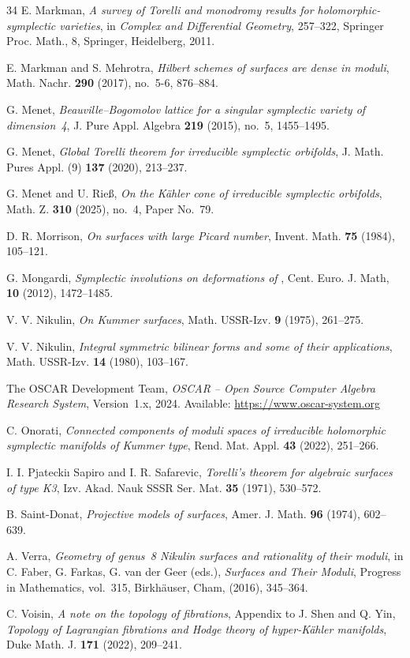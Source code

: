\documentclass{amsart}
\makeatletter
\theoremstyle{definition}
\numberwithin{equation}{section}
\numberwithin{equation}{section} \theoremstyle{definition}
\newcounter{mathrecordid}
\newcommand{\mathboxbegin}[1]{%
  \stepcounter{mathrecordid}%
  \immediate\write\mathrecords{\themathrecordid,#1}%
  \special{pdf:bann << /Type /Annot /Subtype /Link /Border [0 0 0]
    /MathBoxID \themathrecordid /F 2
    /A << /S /URI /URI (urn:mathbox:\themathrecordid) >> >>}}
\newcommand{\mathboxinlineplain}[1]{$#1$}
\newcommand{\mathboxinline}[1]{%
  $\mathboxbegin{inline}%
  \special{pdf:literal direct /MathBoxBegin\themathrecordid\space MP}%
  #1\special{pdf:literal direct /MathBoxEnd\themathrecordid\space MP}%
  \special{pdf:eann}$}
\newcommand{\recordmath}{%
  \ifmeasuring@\expandafter\mathboxinlineplain
  \else\expandafter\mathboxinline\fi}
\makeatother
\begin{document}
\begin{thebibliography}{34}
 E. Markman,
  \emph{A survey of Torelli and monodromy results for holomorphic-symplectic
  varieties}, in {\it Complex and Differential Geometry}, 257--322, Springer
  Proc. Math., 8, Springer, Heidelberg, 2011.

 E. Markman and S. Mehrotra,
  \emph{Hilbert schemes of \recordmath{K3} surfaces are dense in moduli},
  Math. Nachr. {\bf 290} (2017), no.~5-6, 876--884.

 G. Menet,
  \emph{Beauville--Bogomolov lattice for a singular symplectic variety of
  dimension~4}, J. Pure Appl. Algebra {\bf 219} (2015), no.~5, 1455--1495.

 G. Menet,
  \emph{Global Torelli theorem for irreducible symplectic orbifolds},
  J. Math. Pures Appl. (9) {\bf 137} (2020), 213--237.

 G. Menet and U. Rie\ss,
  \emph{On the K\"ahler cone of irreducible symplectic orbifolds},
  Math. Z. {\bf 310} (2025), no.~4, Paper No.~79.

 D. R. Morrison,
  \emph{On \recordmath{K3} surfaces with large Picard number},
  Invent. Math. {\bf 75} (1984), 105--121.

 G. Mongardi,
  \emph{Symplectic involutions on deformations of \recordmath{K3^{[2]}}}, Cent. Euro. J. Math,
 {\bf 10} (2012), 1472--1485.
 
  V. V. Nikulin,
  \emph{On Kummer surfaces}, Math. USSR-Izv. {\bf 9} (1975), 261--275.


 V. V. Nikulin,
  \emph{Integral symmetric bilinear forms and some of their applications},
  Math. USSR-Izv. {\bf 14} (1980), 103--167.


  The OSCAR Development Team,
  \textit{OSCAR -- Open Source Computer Algebra Research System},
  Version~1.x,
  2024.
  Available: \url{https://www.oscar-system.org}


 C. Onorati,
  \emph{Connected components of moduli spaces of irreducible holomorphic
  symplectic manifolds of Kummer type},
  Rend. Mat. Appl. {\bf 43} (2022), 251--266.
 
   I. I. Pjateckiı Sapiro and I. R.
Safarevic, \emph{Torelli’s theorem for algebraic surfaces of
type K3}, Izv. Akad. Nauk SSSR Ser. Mat. {\bf 35} (1971), 530–572.

 B. Saint-Donat,
  \emph{Projective models of \recordmath{K3} surfaces},
  Amer. J. Math. {\bf 96} (1974), 602--639.

 A. Verra,
  \emph{Geometry of genus~8 Nikulin surfaces and rationality of their moduli},
  in C. Faber, G. Farkas, G. van der Geer (eds.), {\it \recordmath{K3} Surfaces and Their
  Moduli}, Progress in Mathematics, vol.~315, Birkh\"auser, Cham, (2016),
   345--364.

 C. Voisin, \emph{A note on the topology of fibrations}, Appendix to J. Shen and Q. Yin, \emph{Topology of Lagrangian fibrations and Hodge theory of hyper-K\"ahler manifolds}, Duke Math. J. {\bf 171} (2022), 209--241.
\end{thebibliography}
\end{document}
